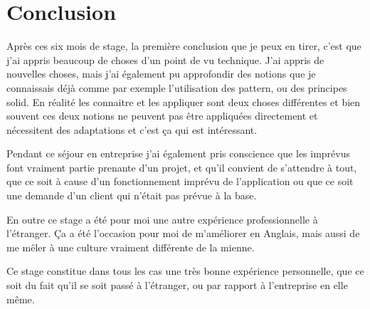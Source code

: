 \documentclass[rapport.tex]{subfiles}
\begin{document}
    \chapter{Conclusion}
    Après ces six mois de stage, la première conclusion
    que je peux en tirer, c'est que j'ai appris beaucoup de choses
    d'un point de vu technique. J'ai appris de nouvelles choses, 
    mais j'ai également pu approfondir des notions que je connaissais
    déjà comme par exemple l'utilisation des \gls{pattern}, ou des principes \gls{solid}.
    En réalité les connaitre et les appliquer sont deux choses différentes et bien souvent
    ces deux notions ne peuvent pas être appliquées directement et nécessitent des adaptations
    et c'est ça qui est intéressant.

    Pendant ce séjour en entreprise j'ai également pris conscience que les imprévus font vraiment partie prenante 
    d'un projet, et qu'il convient de s'attendre à tout, que ce soit à cause d'un fonctionnement imprévu de l'application
    ou que ce soit une demande d'un client qui n'était pas prévue à la base.

    En outre ce stage a été pour moi une autre expérience professionnelle à l'étranger. Ça a été l'occasion
    pour moi de m'améliorer en Anglais, mais aussi de me mêler à une culture vraiment différente de la mienne.

    Ce stage constitue dans tous les cas une très bonne expérience personnelle, que ce soit du fait qu'il se soit passé
    à l'étranger, ou par rapport à l'entreprise en elle même.
\end{document}
